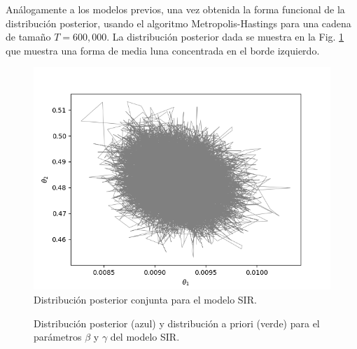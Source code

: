 Análogamente a los modelos previos, una vez obtenida la forma funcional de la distribución posterior, usando el algoritmo Metropolis-Hastings para una cadena de tamaño $T = 600,000$. La distribución posterior dada se muestra en la Fig. \ref{Fig. SIR_03} que muestra una forma de media luna concentrada en el borde izquierdo. 

\begin{figure}[H] 
    \centering 
    \includegraphics[width = 10 cm]{img/Exp_Central_SIR_sigma/Figuras/Generales/Conjunta_SIR_sigma.png} 
    \caption{Distribución posterior conjunta para el modelo SIR.}
    \label{Fig. SIR_03}
\end{figure} 

\begin{figure}[h]
    \centering
    \qquad
    \caption{Distribución posterior (azul) y distribución a priori (verde) para el parámetros $\beta$ y $\gamma$ del modelo SIR. }
    \label{Fig. SIR.theta}
\end{figure}

